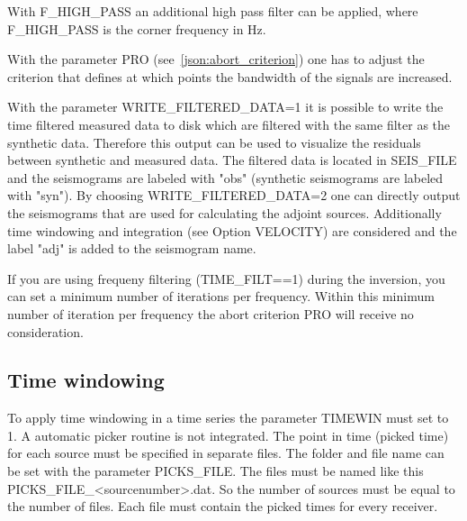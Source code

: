 With F\_HIGH\_PASS an additional high pass filter can be applied, where F\_HIGH\_PASS is the corner frequency in Hz.

With the parameter PRO (see~\ref{json:abort_criterion}) one has to adjust the criterion that defines at which points the bandwidth of the signals are increased.

With the parameter WRITE\_FILTERED\_DATA=1 it is possible to write the time filtered measured data to disk which are filtered with the same filter as the synthetic data. Therefore this output can be used to visualize the residuals between synthetic and measured data. The filtered data is located in SEIS\_FILE and the seismograms are labeled with "obs" (synthetic seismograms are labeled with "syn"). By choosing WRITE\_FILTERED\_DATA=2 one can directly output the seismograms that are used for calculating the adjoint sources. Additionally time windowing and integration (see Option VELOCITY) are considered and the label "adj" is added to the seismogram name.

If you are using frequeny filtering (TIME\_FILT==1) during the inversion, you can set a minimum number of iterations per frequency. Within this minimum number of iteration per frequency the abort criterion PRO will receive no consideration.

\subsection{Time windowing}
{\color{blue}{\begin{verbatim}
"Time windowing" : "comment",
			"TIMEWIN" : "0",
			"TW_IND" : "0",
			"PICKS_FILE" : "./picked_times/picks"
			"TWLENGTH_PLUS" : "0.01",
			"TWLENGTH_MINUS" : "0.01",
			"GAMMA" : "100000",
\end{verbatim}}}

{\color{red}{\begin{verbatim}
Default values are:
	TIMEWIN=0
\end{verbatim}}}

To apply time windowing in a time series the parameter TIMEWIN must set to 1. A automatic picker routine is not integrated. The point in time (picked time) for each source must be specified in separate files. The folder and file name can be set with the parameter PICKS\_FILE. The files must be named like this PICKS\_FILE\_<sourcenumber>.dat. So the number of sources must be equal to the number of files. Each file must contain the picked times for every receiver.

